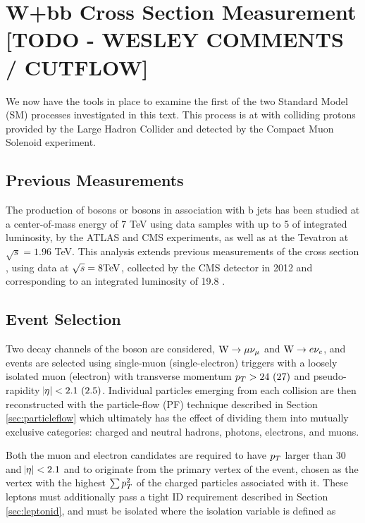 
\chapter{W+bb Cross Section Measurement [TODO - WESLEY COMMENTS / CUTFLOW] }\label{sec:wbbxc}

We now have the tools in place to examine the first of the
 two Standard Model (SM) processes investigated in this text.
This process is \ppwbb at  \TeV with colliding protons
 provided by the Large Hadron Collider and detected
 by the Compact Muon Solenoid experiment. 

\section{Previous Measurements}

The production of \z bosons
 \cite{Chatrchyan:2012vr,Chatrchyan:2014dha,Chatrchyan:2013zja,Aad:2011jn,Aad:2014dvb}
 or \w bosons \cite{Chatrchyan:2013uza,Aad:2013vka}
 in association with b jets has been 
 studied at a center-of-mass
 energy of 7 TeV using data samples with up
 to 5 \fbinv of integrated luminosity,
 by the ATLAS and CMS experiments, 
 as well as at 
 the Tevatron \cite{WbbTevD0,WbbTevCDF} at $\sqrt{s}=1.96$ TeV. 
This analysis extends previous measurements of the \wbb cross section \cite{Chatrchyan:2013uza},
 using data at $\sqrt{s}=8 \mathrm{TeV}$, collected by the CMS detector in 2012 
 and corresponding to an integrated luminosity of 19.8 \fbinv \cite{ref:CMSLumiCalc}.

\section{Event Selection}

 Two decay channels of the \w boson are considered,
  $\mathrm{W}\rightarrow \mu\nu_\mu$ and $\mathrm{W}\rightarrow e\nu_e$,
 and events are selected using
 single-muon (single-electron) triggers with a
 loosely isolated muon (electron)
 with transverse momentum $p_T>24~(27)$ \GeV
 and pseudo-rapidity $\abs{\eta}<2.1~(2.5)$.
Individual particles emerging from each collision are then reconstructed with the
 particle-flow (PF) technique described in Section \ref{sec:particleflow}
 which ultimately has the effect of dividing them 
 into mutually exclusive categories:
 charged and neutral hadrons, photons, electrons, and muons.

Both the muon and electron candidates are required to have 
 $p_T$ larger than 30 \GeV and $\abs{\eta}<2.1$ and
 to originate from the primary vertex of the event,
 chosen as the vertex with the highest $\sum p_T^2$
 of the charged particles associated with it.
These leptons must additionally pass a tight ID requirement 
 described in Section \ref{sec:leptonid},
 and  must be isolated where
 the isolation variable is defined as

